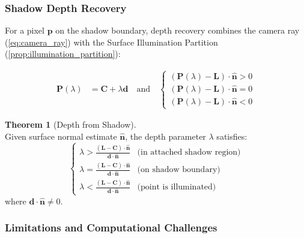 \documentclass[12pt]{article}
\newcommand{\vect}[1]{\bm{#1}}
\theoremstyle{definition}
\newtheorem{theorem}{Theorem}[subsection]
\begin{document}
\subsubsection*{Shadow Depth Recovery} \label{sec:shadow_depth}

For a pixel $\vect{p}$ on the shadow boundary, depth recovery combines the camera ray (\ref{eq:camera_ray}) with the Surface Illumination Partition (\ref{prop:illumination_partition}):

\begin{equation}
\boxed{
\begin{aligned}
\vect{P}(\lambda) &= \vect{C} + \lambda \vect{d} \quad \text{and} \quad
\begin{cases}
(\vect{P}(\lambda) - \vect{L}) \cdot \hat{\vect{n}} > 0 \\[6pt]
(\vect{P}(\lambda) - \vect{L}) \cdot \hat{\vect{n}} = 0 \\[6pt]
(\vect{P}(\lambda) - \vect{L}) \cdot \hat{\vect{n}} < 0
\end{cases}
\end{aligned}
}
\label{eq:shadow_depth_system}
\end{equation}

\begin{theorem}[Depth from Shadow] \label{thm:shadow_depth} ~\\
Given surface normal estimate \(\hat{\vect{n}}\), the depth parameter \(\lambda\) satisfies:
\begin{equation}
\boxed{
\begin{cases}
\lambda > \displaystyle \frac{(\vect{L} - \vect{C}) \cdot \hat{\vect{n}}}{\vect{d} \cdot \hat{\vect{n}}} & \text{(in attached shadow region)} \\[8pt]
\lambda = \displaystyle \frac{(\vect{L} - \vect{C}) \cdot \hat{\vect{n}}}{\vect{d} \cdot \hat{\vect{n}}} & \text{(on shadow boundary)} \\[8pt]
\lambda < \displaystyle \frac{(\vect{L} - \vect{C}) \cdot \hat{\vect{n}}}{\vect{d} \cdot \hat{\vect{n}}} & \text{(point is illuminated)}
\end{cases}
}
\label{eq:lambda_solution}
\end{equation}
where \(\vect{d} \cdot \hat{\vect{n}} \neq 0\).
\end{theorem}

\subsubsection*{Limitations and Computational Challenges} \label{sec:shadow_limitations}
\end{document}
